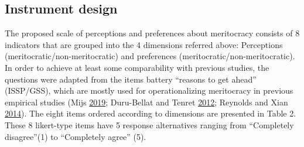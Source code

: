 \documentclass[
]{article}
\begin{document}
\hypertarget{instrument-design}{%
\subsection{Instrument design}\label{instrument-design}}

The proposed scale of perceptions and preferences about meritocracy
consists of 8 indicators that are grouped into the 4 dimensions referred
above: Perceptions (meritocratic/non-meritocratic) and preferences
(meritocratic/non-meritocratic). In order to achieve at least some
comparability with previous studies, the questions were adapted from the
items battery ``reasons to get ahead'' (ISSP/GSS), which are mostly used
for operationalizing meritocracy in previous empirical studies (Mijs
\protect\hyperlink{ref-mijs_paradox_2019}{2019}; Duru-Bellat and Tenret
\protect\hyperlink{ref-duru-bellat_whos_2012}{2012}; Reynolds and Xian
\protect\hyperlink{ref-reynolds_perceptions_2014}{2014}). The eight
items ordered according to dimensions are presented in Table 2. These 8
likert-type items have 5 response alternatives ranging from ``Completely
disagree''(1) to ``Completely agree'' (5).
\end{document}
